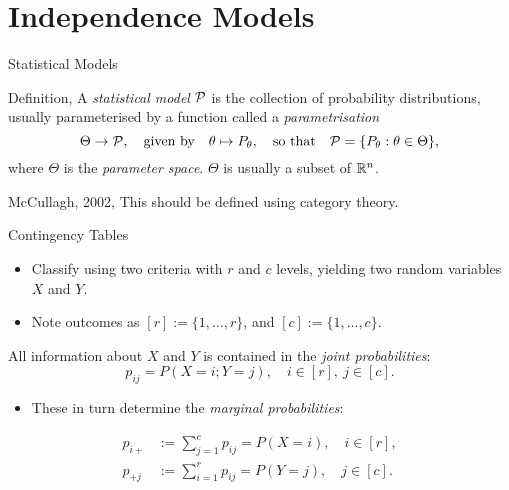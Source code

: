\section{Independence Models}

\begin{frame}{Statistical Models}
    \begin{block}{Definition, \cite{}}
    A \emph{statistical model} $\mathcal{P}$ is the collection of probability distributions, usually parameterised by a function  called a \emph{parametrisation}
    $$ \Theta \rightarrow \mathcal{P}, \quad \text{given by} \quad \theta \mapsto P_{\theta},\quad \text{so that}\quad \mathcal{P} = \{ P_{\theta} : \theta \in \Theta \}, $$
    where $\Theta$ is the \emph{parameter space}. $\Theta$ is usually a subset of $\mathbb{R}^{n}$.
    \end{block}

    \begin{block}{McCullagh, 2002, \cite{PM2002}}
    This should be defined using category theory.
    \end{block}

\end{frame}

\begin{frame}{Contingency Tables}
    
    \begin{itemize}
        \item Classify using two criteria with $r$ and $c$ levels, yielding two random variables $X$ and $Y$. 
        \item Note outcomes as $[r] := \{1,\ldots, r\}$, and $[c] := \{ 1, \ldots, c \}$.
    \end{itemize}
    
    All information about $X$ and $Y$ is contained in the \emph{joint probabilities}:
    $$ p_{ij} = P(X = i; Y = j), \quad i \in [r],\ j \in [c]. $$

    \begin{itemize}
        \item These in turn determine the \emph{marginal probabilities}:
    \end{itemize}
    \vspace*{-12pt}
    \begin{equation*}
        \begin{split}
            p_{i+} &:= \sum_{j = 1}^{c} p_{ij} = P(X = i), \quad i \in [r], \\
            p_{+j} &:= \sum_{i = 1}^{r} p_{ij} = P(Y = j), \quad j \in [c].
        \end{split}
    \end{equation*}

\end{frame}

